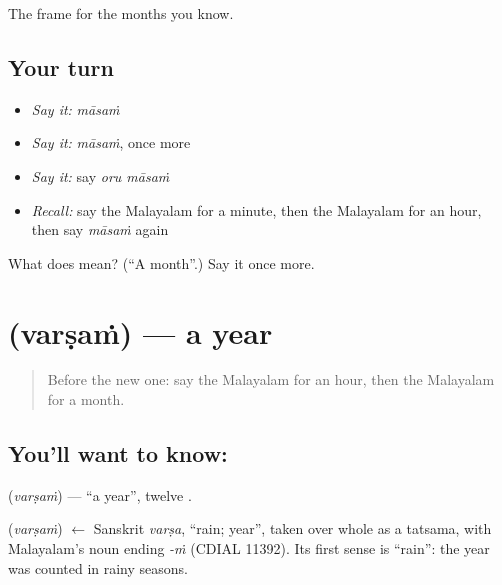 \begin{grammarlens}[title={What you've built}]
The frame for the months you know.
\end{grammarlens}

\subsection*{Your turn}
\begin{itemize}
\raggedright
  \item \emph{Say it:} \emph{māsaṁ}
  \item \emph{Say it:} \emph{māsaṁ}, once more
  \item \emph{Say it:} say \emph{oru māsaṁ}
  \item \emph{Recall:} say the Malayalam for a minute, then the Malayalam for an hour, then say \emph{māsaṁ} again
\end{itemize}

\begin{tcolorbox}[breakable,colback=teal!4,colframe=teal!35!black,title={Before you move on}]
What does  mean? (\textquotedblleft{}A month\textquotedblright{}.) Say it once more.
\end{tcolorbox}
\section[\texorpdfstring{\ml{വർഷം} (varṣaṁ)}{വർഷം (varṣaṁ)}]{ (varṣaṁ) — a year}

\label{lesson:ML-C139-year}



\begin{quote}
Before the new one: say the Malayalam for an hour, then the Malayalam for a month.
\end{quote}

\subsection*{You'll want to know: }
\textbf{} (\emph{varṣaṁ}) — \textquotedblleft{}a year\textquotedblright{}, twelve \textbf{}.

\begin{cousinweb}
\textbf{} (\emph{varṣaṁ}) $\leftarrow$ Sanskrit \emph{varṣa}, \textquotedblleft{}rain; year\textquotedblright{}, taken over whole as a tatsama, with Malayalam's noun ending \emph{-ṁ} (CDIAL 11392). Its first sense is \textquotedblleft{}rain\textquotedblright{}: the year was counted in rainy seasons.
\end{cousinweb}

